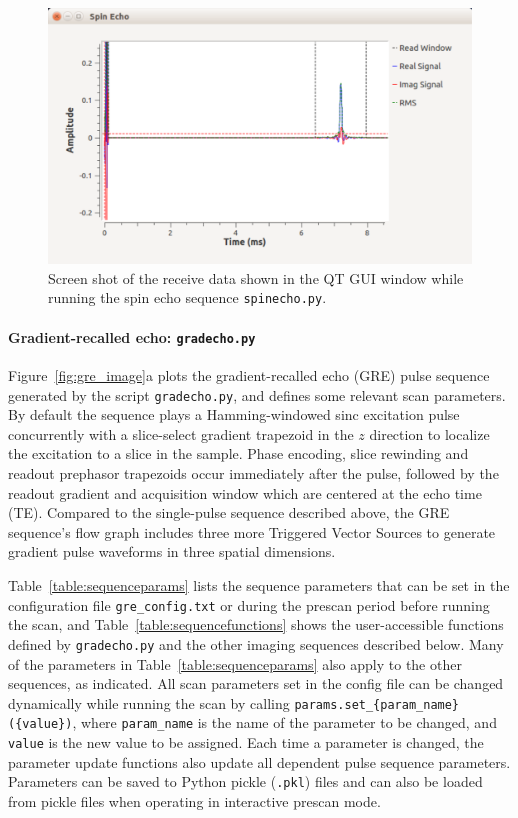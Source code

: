 \documentclass[10pt,letterpaper]{article}
\begin{document}
\begin{figure}[!ht]
\begin{center}
\includegraphics[width = 1\textwidth,trim=0 0 0 0,clip=false]{scan_screenshot.png}
\caption{Screen shot of the receive data shown in the QT GUI window while running the spin echo sequence \texttt{spinecho.py}.}
\label{fig:gui}
\end{center}
\end{figure}

\paragraph{Gradient-recalled echo: \texttt{gradecho.py}}
Figure~\ref{fig:gre_image}a plots the gradient-recalled echo (GRE) pulse sequence 
generated by the script \texttt{gradecho.py}, 
and defines some relevant scan parameters.  
By default the sequence plays a Hamming-windowed sinc excitation pulse
concurrently with a slice-select gradient trapezoid in the $z$ direction to localize the excitation to a slice in the sample.
Phase encoding, slice rewinding and readout prephasor trapezoids occur immediately after the pulse,
followed by the readout gradient and acquisition window which are centered at the echo time (TE). 
Compared to the single-pulse sequence described above, 
the GRE sequence's flow graph includes three more Triggered Vector Sources to generate 
gradient pulse waveforms in three spatial dimensions.

\par Table~\ref{table:sequenceparams} lists the sequence parameters that can be set in the configuration file
\texttt{gre\_config.txt} or during the prescan period before running the scan, 
and Table~\ref{table:sequencefunctions} shows the user-accessible functions defined by \texttt{gradecho.py}
and the other imaging sequences described below.  
Many of the parameters in Table~\ref{table:sequenceparams} also apply to the other sequences,
as indicated. 
All scan parameters set in the config file can be changed dynamically while running the scan by calling \texttt{params.set\_\{param\_name\}(\{value\})}, where \texttt{param\_name} is the name of the parameter to be changed, 
and \texttt{value} is the new value to be assigned.
Each time a parameter is changed, the parameter update functions also update all dependent pulse sequence parameters.
Parameters can be saved to Python pickle (\texttt{.pkl}) files and can also be loaded from pickle files when operating in interactive prescan mode.
\end{document}
